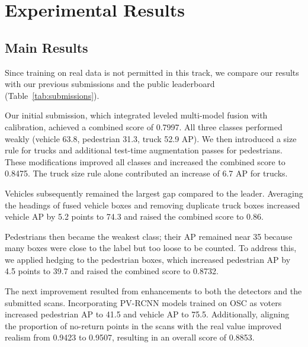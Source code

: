 \documentclass[conference]{IEEEtran}
\newcommand{\ph}[1]{\textcolor{red}{[#1]}}
\begin{document}
\section{Experimental Results}
\label{sec:results}

\subsection{Main Results}

Since training on real data is not permitted in this track, we compare our results with our previous submissions and the public leaderboard (Table~\ref{tab:submissions}).

Our initial submission, which integrated leveled multi-model fusion with calibration, achieved a combined score of 0.7997. All three classes performed weakly (vehicle 63.8, pedestrian 31.3, truck 52.9 AP). We then introduced a size rule for trucks and additional test-time augmentation passes for pedestrians. These modifications improved all classes and increased the combined score to 0.8475. The truck size rule alone contributed an increase of 6.7 AP for trucks.

Vehicles subsequently remained the largest gap compared to the leader. Averaging the headings of fused vehicle boxes and removing duplicate truck boxes increased vehicle AP by 5.2 points to 74.3 and raised the combined score to 0.86.

Pedestrians then became the weakest class; their AP remained near 35 because many boxes were close to the label but too loose to be counted. To address this, we applied hedging to the pedestrian boxes, which increased pedestrian AP by 4.5 points to 39.7 and raised the combined score to 0.8732.

The next improvement resulted from enhancements to both the detectors and the submitted scans. Incorporating PV-RCNN models trained on OSC as voters increased pedestrian AP to 41.5 and vehicle AP to 75.5. Additionally, aligning the proportion of no-return points in the scans with the real value improved realism from 0.9423 to 0.9507, resulting in an overall score of 0.8853.
\end{document}
